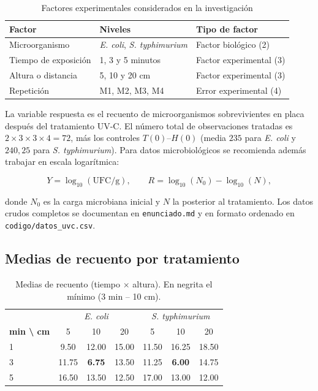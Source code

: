 \documentclass[12pt,a4paper]{article}
\begin{document}
\begin{table}[H]
\centering
\caption{Factores experimentales considerados en la investigación}
\begin{tabular}{lll}
\toprule
\textbf{Factor} & \textbf{Niveles} & \textbf{Tipo de factor}\\
\midrule
Microorganismo & \textit{E. coli}, \textit{S. typhimurium} & Factor biológico (2)\\
Tiempo de exposición & 1, 3 y 5 minutos & Factor experimental (3)\\
Altura o distancia & 5, 10 y 20 cm & Factor experimental (3)\\
Repetición & M1, M2, M3, M4 & Error experimental (4)\\
\bottomrule
\end{tabular}
\end{table}

La variable respuesta es el recuento de microorganismos sobrevivientes en placa después del tratamiento UV-C. El número total de observaciones tratadas es $2\times3\times3\times4=72$, más los controles $T(0)\text{--}H(0)$ (media $235$ para \textit{E. coli} y $240{,}25$ para \textit{S. typhimurium}). Para datos microbiológicos se recomienda además trabajar en escala logarítmica:

\[
Y = \log_{10}(\text{UFC/g}), \qquad
R = \log_{10}(N_0) - \log_{10}(N),
\]

donde \(N_0\) es la carga microbiana inicial y \(N\) la posterior al tratamiento. Los datos crudos completos se documentan en \texttt{enunciado.md} y en formato ordenado en \texttt{codigo/datos\_uvc.csv}.

\subsection{Medias de recuento por tratamiento}

\begin{table}[H]
\centering
\caption{Medias de recuento (tiempo $\times$ altura). En negrita el mínimo (3 min -- 10 cm).}
\begin{tabular}{lccc|ccc}
\toprule
 & \multicolumn{3}{c|}{\textit{E. coli}} & \multicolumn{3}{c}{\textit{S. typhimurium}}\\
\textbf{min \textbackslash{} cm} & 5 & 10 & 20 & 5 & 10 & 20\\
\midrule
1 & 9.50 & 12.00 & 15.00 & 11.50 & 16.25 & 18.50\\
3 & 11.75 & \textbf{6.75} & 13.50 & 11.25 & \textbf{6.00} & 14.75\\
5 & 16.50 & 13.50 & 12.50 & 17.00 & 13.00 & 12.00\\
\bottomrule
\end{tabular}
\end{table}
\end{document}
